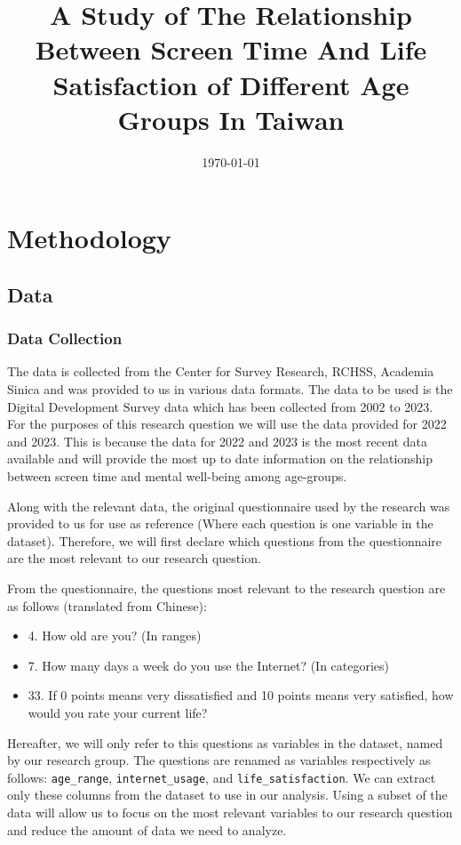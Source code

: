\documentclass[12pt, a4paper]{article}
\title{\textbf{A Study of The Relationship Between Screen Time And Life Satisfaction of Different Age Groups In Taiwan}}
\author{{\small Fausto Urrutia (B11303091) \and \small Chintara Sahelangi (B12303097) \and \small Yanisa Saengcharoensuklert (B11303085)}}
\date{\today}
\begin{document}
\maketitle


\section{Methodology}

\subsection{Data}
\subsubsection{Data Collection}

\par The data is collected from the Center for Survey Research, RCHSS, Academia Sinica and was provided to us in various data formats. The data to be used is the Digital Development Survey data which has been collected from 2002 to 2023.
For the purposes of this research question we will use the data provided for 2022 and 2023. This is because the data for 2022 and 2023 is the most recent data available and will provide the most up to date information on the relationship between screen time and mental well-being among age-groups.
\par Along with the relevant data, the original questionnaire used by the research was provided to us for use as reference (Where each question is one variable in the dataset). Therefore, we will first declare which questions from the questionnaire are the most relevant to our research question.
\par From the questionnaire, the questions most relevant to the research question are as follows (translated from Chinese):
\begin{itemize}
    \item 4. How old are you? {\footnotesize(In ranges)}
    \item 7. How  many  days  a  week  do  you  use  the  Internet? {\footnotesize(In categories)}
    \item 33.  If  0  points  means  very  dissatisfied  and  10  points  means  very  satisfied,  how  would  you  rate  your  current  life?
\end{itemize}
\par Hereafter, we will only refer to this questions as variables in the dataset, named by our research group.
The questions are renamed as variables respectively as follows: \texttt{age\_range}, \texttt{internet\_usage}, and \texttt{life\_satisfaction}.
We can extract only these columns from the dataset to use in our analysis. Using a subset of the data will allow us to focus on the most relevant variables to our research question and reduce the amount of data we need to analyze.
\end{document}
